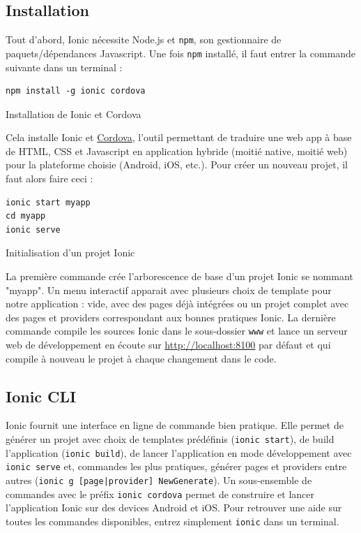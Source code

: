 \documentclass[a4paper, 12pt]{article}
\newenvironment{code}{\captionsetup{type=listing}}{}
\begin{document}
\subsection{Installation}
Tout d'abord, Ionic nécessite Node.js et \texttt{npm}, son gestionnaire de paquets/dépendances Javascript.
Une fois \texttt{npm} installé, il faut entrer la commande suivante dans un terminal :
\begin{code}
    \begin{verbatim}
npm install -g ionic cordova
    \end{verbatim}
    \caption{Installation de Ionic et Cordova}
    \label{install_ionic_cordova}
\end{code}
\bigbreak
Cela installe Ionic et \href{https://cordova.apache.org}{Cordova}, l'outil permettant de traduire une web app à base de
HTML, CSS et Javascript en application hybride (moitié native, moitié web) pour la plateforme choisie (Android, iOS, etc.).
Pour créer un nouveau projet, il faut alors faire ceci :
\begin{code}
    \begin{verbatim}
ionic start myapp
cd myapp
ionic serve
    \end{verbatim}
    \caption{Initialisation d'un projet Ionic}
\end{code}
\bigbreak
La première commande crée l'arborescence de base d'un projet Ionic se nommant "myapp". Un menu interactif apparait avec
plusieurs choix de template pour notre application : vide, avec des pages déjà intégrées ou un projet complet avec des pages
et providers correspondant aux bonnes pratiques Ionic.
La dernière commande compile les sources Ionic dans le sous-dossier \texttt{www}
et lance un serveur web de développement en écoute sur \url{http://localhost:8100} par défaut et qui compile à nouveau le projet à chaque
changement dans le code.

\subsection{Ionic CLI}
Ionic fournit une interface en ligne de commande bien pratique. Elle permet de générer un projet avec choix de templates
prédéfinis (\texttt{ionic start}), de build l'application (\texttt{ionic build}), de lancer l'application
en mode développement avec \texttt{ionic serve} et, commandes les plus pratiques, générer pages et providers entre
autres (\texttt{ionic g [page|provider] NewGenerate}). Un sous-ensemble de
commandes avec le préfix \texttt{ionic cordova} permet de construire et lancer l'application Ionic sur des devices
Android et iOS. Pour retrouver une aide sur toutes les commandes disponibles, entrez simplement \texttt{ionic}
dans un terminal.
\end{document}
